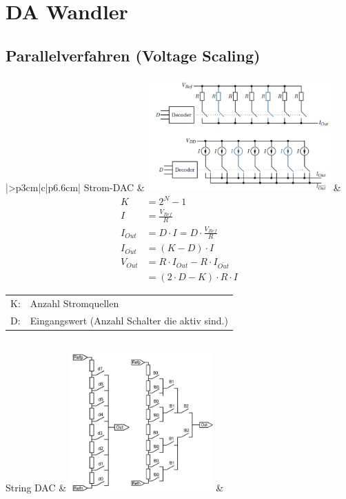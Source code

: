 \section{DA Wandler}

\subsection{Parallelverfahren (Voltage Scaling)}

\renewcommand{\arraystretch}{1}
\begin{tabular}{|>{\bfseries}p{3cm}|c|p{6.6cm}|}
	\hline
	Strom-DAC \hartl{456} 
	& \includegraphics[width=7cm, valign=t]{pictures/Strom-DAC}
	& {\begin{align*}
		K &=2^N-1\\
		I &=\frac{V_{Ref}}{R}\\
		I_{Out} &=D \cdot I=D\cdot\frac{V_{Ref}}{R}\\
		I_{\bar{Out}} &=(K-D)\cdot I\\
		V_{Out} &=R\cdot I_{Out}-R\cdot I_{\bar{Out}} \\
			    &=(2\cdot D-K)\cdot R\cdot I	
	  \end{align*}}
	  \begin{tabular}{lp{5cm}}
	  	K: & Anzahl Stromquellen \\
      	D: & Eingangswert (Anzahl Schalter die aktiv sind.)
      \end{tabular}
	\\ \hline
	String DAC 
	& \includegraphics[width=5.5cm, valign=t]{pictures/string_DAC}
	& 

\end{tabular}
